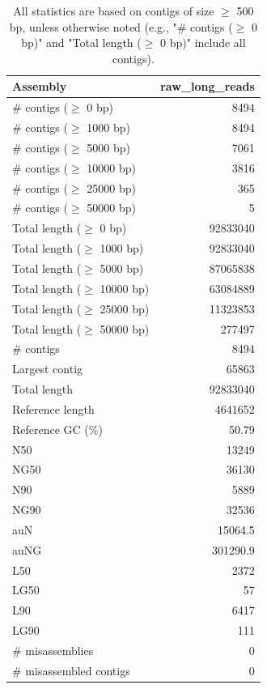 \documentclass[12pt,a4paper]{article}
\begin{document}
\begin{table}[ht]
\begin{center}
\caption{All statistics are based on contigs of size $\geq$ 500 bp, unless otherwise noted (e.g., "\# contigs ($\geq$ 0 bp)" and "Total length ($\geq$ 0 bp)" include all contigs).}
\begin{tabular}{|l*{1}{|r}|}
\hline
Assembly & raw\_long\_reads \\ \hline
\# contigs ($\geq$ 0 bp) & 8494 \\ \hline
\# contigs ($\geq$ 1000 bp) & 8494 \\ \hline
\# contigs ($\geq$ 5000 bp) & 7061 \\ \hline
\# contigs ($\geq$ 10000 bp) & 3816 \\ \hline
\# contigs ($\geq$ 25000 bp) & 365 \\ \hline
\# contigs ($\geq$ 50000 bp) & 5 \\ \hline
Total length ($\geq$ 0 bp) & 92833040 \\ \hline
Total length ($\geq$ 1000 bp) & 92833040 \\ \hline
Total length ($\geq$ 5000 bp) & 87065838 \\ \hline
Total length ($\geq$ 10000 bp) & 63084889 \\ \hline
Total length ($\geq$ 25000 bp) & 11323853 \\ \hline
Total length ($\geq$ 50000 bp) & 277497 \\ \hline
\# contigs & 8494 \\ \hline
Largest contig & 65863 \\ \hline
Total length & 92833040 \\ \hline
Reference length & 4641652 \\ \hline
Reference GC (\%) & 50.79 \\ \hline
N50 & 13249 \\ \hline
NG50 & 36130 \\ \hline
N90 & 5889 \\ \hline
NG90 & 32536 \\ \hline
auN & 15064.5 \\ \hline
auNG & 301290.9 \\ \hline
L50 & 2372 \\ \hline
LG50 & 57 \\ \hline
L90 & 6417 \\ \hline
LG90 & 111 \\ \hline
\# misassemblies & 0 \\ \hline
\# misassembled contigs & 0 \\ \hline

\end{tabular}
\end{center}
\end{table}
\end{document}
